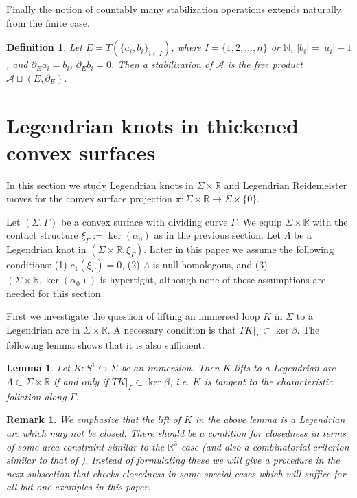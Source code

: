 \documentclass[11pt]{amsart}
\theoremstyle{mystyle}
\newtheorem{definition}{Definition}[section]
\newtheorem{lemma}[lemma]{Lemma}
\newtheorem{remark}[remark]{Remark}
\newcommand{\N}{\mathbb{N}}
\newcommand{\R}{\mathbb{R}}
\newcommand{\<}{\langle}
\renewcommand{\>}{\rangle}
\begin{document}
Finally the notion of countably many stabilization operations extends naturally from the finite case.

\begin{definition}
    Let $E = T(\{a_i, b_i\}_{i \in I})$, where $I = \{1, 2, \dots, n\}$ or $\N$, $|b_i| = |a_i| - 1$, and $\partial_E a_i = b_i$, $\partial_E b_i = 0$. Then a \textit{stabilization} of $\mathcal{A}$ is the free product $\mathcal{A} \sqcup (E, \partial_E)$.
\end{definition}

\section{Legendrian knots in thickened convex surfaces}\label{sec:Leg knots}

In this section we study Legendrian knots in $\Sigma \times \R$ and Legendrian Reidemeister moves for the convex surface projection $\pi: \Sigma \times \R \rightarrow \Sigma\times \{0\}$.

Let $(\Sigma, \Gamma)$ be a convex surface with dividing curve $\Gamma$. We equip $\Sigma\times \R$ with the contact structure $ \xi_\Gamma:=\ker(\alpha_0)$ as in the previous section. Let $\Lambda$ be a Legendrian knot in $(\Sigma \times \R, \xi_\Gamma)$. Later in this paper we assume the following conditions: (1)  $c_1(\xi_\Gamma) = 0$, (2) $\Lambda$ is null-homologous, and (3) $(\Sigma\times \R,\ker(\alpha_0))$ is hypertight, although none of these assumptions are needed for this section.

First we investigate the question of lifting an immersed loop $K$ in $\Sigma$ to a Legendrian arc in $\Sigma \times \R$. A necessary condition is that $TK|_\Gamma \subset \ker \beta$. The following lemma shows that it is also sufficient.

\begin{lemma}\label{lem:legendrian lift}
    Let $K:S^1\hookrightarrow \Sigma$ be an immersion. Then $K$ lifts to a Legendrian arc $\Lambda \subset \Sigma \times \R$ if and only if $TK|_\Gamma \subset \ker \beta$, i.e. $K$ is tangent to the characteristic foliation along $\Gamma$.
\end{lemma}

\begin{remark}
    We emphasize that the lift of $K$ in the above lemma is a Legendrian \textit{arc} which may not be closed. There should be a condition for closedness in terms of some area constraint similar to the $\R^3$ case (and also a combinatorial criterion similar to that of \cite[Sec. 11]{chekanov2002dga}). Instead of formulating these we will give a procedure in the next subsection that checks closedness in some special cases which will suffice for all but one examples in this paper.
\end{remark}
\end{document}

